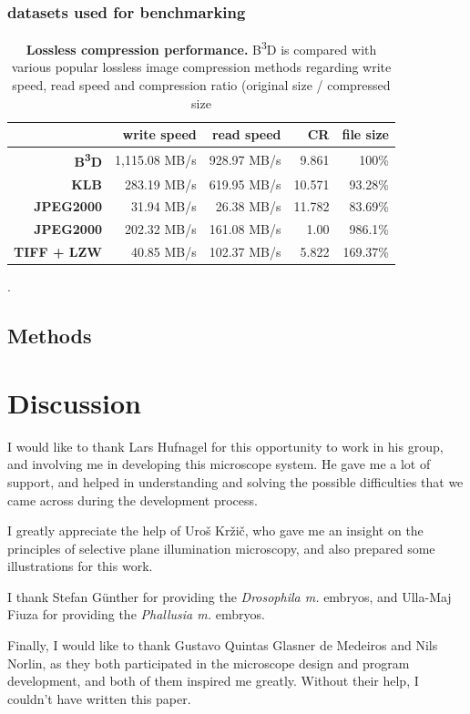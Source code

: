 \documentclass{diploma_style}
\newcommand{\bbbd}{B\textsuperscript{3}D }
\begin{document}
\subsection{datasets used for benchmarking}
\begin{table}[tbp]
\renewcommand{\arraystretch}{2}
\centering
\begin{tabular}{rrrrr}
	& \textbf{write speed} & \textbf{read speed} & \textbf{CR} & \textbf{file size} \\
	\hline
	\hline
	\textbf{\bbbd} & 1,115.08 MB/s & 928.97 MB/s & 9.861 & 100\% \\ \hline
	\textbf{KLB} & 283.19 MB/s & 619.95 MB/s & 10.571 & 93.28\% \\ \hline
	\textbf{JPEG2000} & 31.94 MB/s & 26.38 MB/s & 11.782 & 83.69\% \\ \hline
	\textbf{JPEG2000} & 202.32 MB/s & 161.08 MB/s & 1.00 & 986.1\% \\ \hline
	\textbf{TIFF + LZW} & 40.85 MB/s & 102.37 MB/s & 5.822 & 169.37\%
\end{tabular}
\caption{\textbf{Lossless compression performance.} \bbbd is compared with various popular lossless image compression methods regarding write speed, read speed and compression ratio (original size / compressed size}.
\label{tab:performance}
\end{table}

\section{Methods}


\chapter{Discussion}



\newpage
\cleardoublepage
{}
\begin{acknowledgements}

I would like to thank Lars Hufnagel for this opportunity to work in his group, and involving me in developing this microscope system. He gave me a lot of support, and helped in understanding and solving the possible difficulties that we came across during the development process.

I greatly appreciate the help of Uroš Kržič, who gave me an insight on the principles of selective plane illumination microscopy, and also prepared some illustrations for this work.

I thank Stefan Günther for providing the \textit{Drosophila m.} embryos, and \mbox{Ulla-Maj} Fiuza for providing the \textit{Phallusia m.} embryos.

Finally, I would like to thank Gustavo Quintas Glasner de Medeiros and Nils Norlin, as they both participated in the microscope design and program development, and both of them inspired me greatly. Without their help, I couldn't have written this paper.

\end{acknowledgements}

\cleardoublepage
{}
{}

{ \footnotesize }
\end{document}
